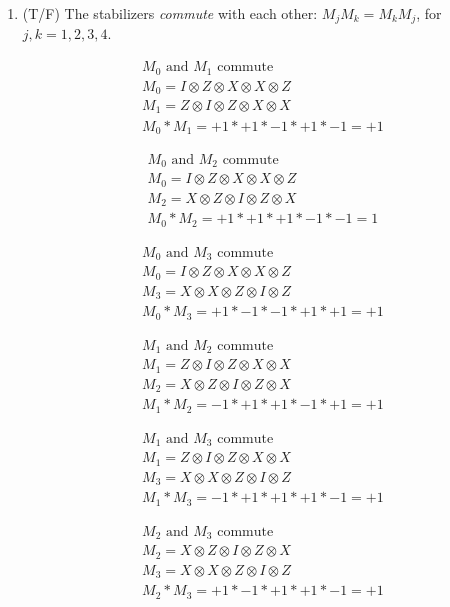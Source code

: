 \documentclass{article}
\begin{document}
\begin{enumerate}
\item (T/F) The stabilizers {\em commute} with each other: $M_j M_k = M_k M_j$, for $j,k=1,2,3,4$.

  \begin{gather*}
    M_0 \text{ and } M_1 \text{ commute}\\
    M_0 = I \otimes Z \otimes X \otimes X \otimes Z\\
    M_1 = Z \otimes I \otimes Z \otimes X \otimes X\\
    M_0 * M_1 = +1 * +1 * -1 * +1 * -1 = +1
  \end{gather*}

  \begin{gather*}
    M_0 \text{ and } M_2 \text{ commute}\\
    M_0 = I \otimes Z \otimes X \otimes X \otimes Z\\
    M_2 = X \otimes Z \otimes I \otimes Z \otimes X\\
    M_0 * M_2 = +1 * +1 * +1 * -1 * -1 = 1
  \end{gather*}

  \begin{gather*}
    M_0 \text{ and } M_3 \text{ commute}\\
    M_0 = I \otimes Z \otimes X \otimes X \otimes Z\\
    M_3 = X \otimes X \otimes Z \otimes I \otimes Z\\
    M_0 * M_3 = +1 * -1 * -1 * +1 * +1 = +1
  \end{gather*}

  \begin{gather*}
    M_1 \text{ and } M_2 \text{ commute}\\
    M_1 = Z \otimes I \otimes Z \otimes X \otimes X\\
    M_2 = X \otimes Z \otimes I \otimes Z \otimes X\\
    M_1 * M_2 = -1 * +1 * +1 * -1 * +1 = +1
  \end{gather*}

  \begin{gather*}
    M_1 \text{ and } M_3 \text{ commute}\\
    M_1 = Z \otimes I \otimes Z \otimes X \otimes X\\
    M_3 = X \otimes X \otimes Z \otimes I \otimes Z\\
    M_1 * M_3 = -1 * +1 * +1 * +1 * -1 = +1
  \end{gather*}

  \begin{gather*}
    M_2 \text{ and } M_3 \text{ commute}\\
    M_2 = X \otimes Z \otimes I \otimes Z \otimes X\\
    M_3 = X \otimes X \otimes Z \otimes I \otimes Z\\
    M_2 * M_3 = +1 * -1 * +1 * +1 * -1 = +1
  \end{gather*}


\end{enumerate}
\end{document}
